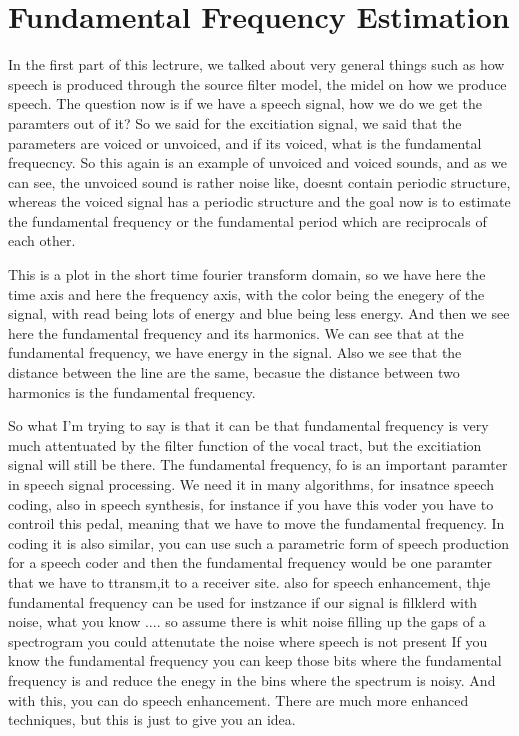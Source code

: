\clearpage
\section{Fundamental Frequency Estimation}
\label{Fundamental Frequency Estimation}




In the first part of this lectrure, we talked about very general things such as how speech is produced through the source filter model, the midel on how we produce speech.  The question now is if we have a speech signal, how we do we get the paramters out of it? So we said for the excitiation signal, we said that the parameters are voiced or unvoiced, and if its voiced, what is the fundamental frequecncy. So this again is an example of unvoiced and voiced sounds, and as we can see, the unvoiced sound is rather noise like, doesnt contain periodic structure, whereas the voiced signal has a periodic structure and the goal now is to estimate the fundamental frequency or the fundamental period which are reciprocals of each other. 

This is a plot in the short time fourier transform domain, so we have here the time axis and here the frequency axis, with the color being the enegery of the signal, with read being lots of energy and blue being less energy. And then we see here the fundamental frequency and its harmonics.  We can see that at the fundamental frequency, we have energy in the signal. Also we see that the distance between the line are the same, becasue the distance between two harmonics is the fundamental frequency. 

So what I'm trying to say is that it can be that fundamental frequency is very much attentuated by the filter function of the vocal tract, but the excitiation signal will still be there. The fundamental frequency, fo is an important paramter in speech signal processing.  We need it in many algorithms, for insatnce speech coding, also in speech synthesis, for instance if you have this voder you have to controil this pedal, meaning that we have to move the fundamental frequency. In coding it is also similar, you can use such a parametric form of speech production for a speech coder and then the fundamental frequency would be one paramter that we have to ttransm,it to a receiver site. also for speech enhancement, thje fundamental frequency can be used for instzance if our signal is filklerd with noise, what you know ....
so assume there is whit noise filling up the gaps of a spectrogram you could attenutate the noise where speech is not present If you know the fundamental frequency you can keep those bits where the fundamental frequency is and reduce the enegy in the bins where the spectrum is noisy.  And with this, you can do speech enhancement. There are much more enhanced techniques, but this is just to give you an idea.  

